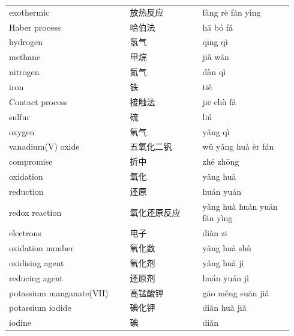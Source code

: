 \documentclass[11pt]{article}
\begin{document}
\begin{longtable}{@{}p{0.40\linewidth}p{0.24\linewidth}p{0.30\linewidth}@{}}
exothermic & 放热反应 & fàng rè fǎn yìng \\
Haber process & 哈伯法 & hā bó fǎ \\
hydrogen & 氢气 & qīng qì \\
methane & 甲烷 & jiǎ wán \\
nitrogen & 氮气 & dàn qì \\
iron & 铁 & tiě \\
Contact process & 接触法 & jiē chù fǎ \\
sulfur & 硫 & liú \\
oxygen & 氧气 & yǎng qì \\
vanadium(V) oxide & 五氧化二钒 & wǔ yǎng huà èr fán \\
compromise & 折中 & zhé zhōng \\
oxidation & 氧化 & yǎng huà \\
reduction & 还原 & huán yuán \\
redox reaction & 氧化还原反应 & yǎng huà huán yuán fǎn yìng \\
electrons & 电子 & diàn zi \\
oxidation number & 氧化数 & yǎng huà shù \\
oxidising agent & 氧化剂 & yǎng huà jì \\
reducing agent & 还原剂 & huán yuán jì \\
potassium manganate(VII) & 高锰酸钾 & gāo měng suān jiǎ \\
potassium iodide & 碘化钾 & diǎn huà jiǎ \\
iodine & 碘 & diǎn \\
\end{longtable}
\end{document}
